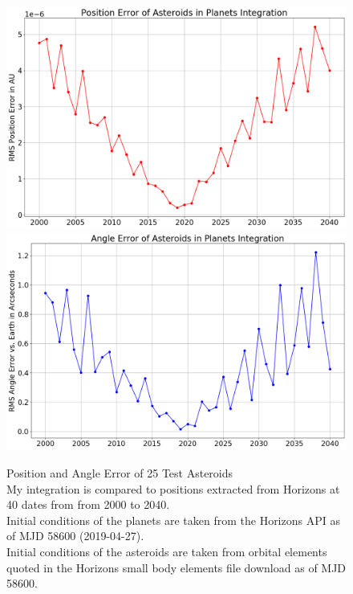 \begin{figure}[hbt!]
\begin{center}
\includegraphics[width=1.0\textwidth]{../figs/integration_test/asteroids/sim_error_planets_asteroids_pos.png}
\includegraphics[width=1.0\textwidth]{../figs/integration_test/asteroids/sim_error_planets_asteroids_angle.png}
\caption[Position and Angle Error of 25 Test Asteroids]
{Position and Angle Error of 25 Test Asteroids\\
My integration is compared to positions extracted from Horizons at 40 dates from from 2000 to 2040.\\
Initial conditions of the planets are taken from the Horizons API as of MJD 58600 (2019-04-27). \\
Initial conditions of the asteroids are taken from orbital elements quoted in the 
Horizons small body elements file download as of MJD 58600.}
\end{center}
\end{figure}
\clearpage

